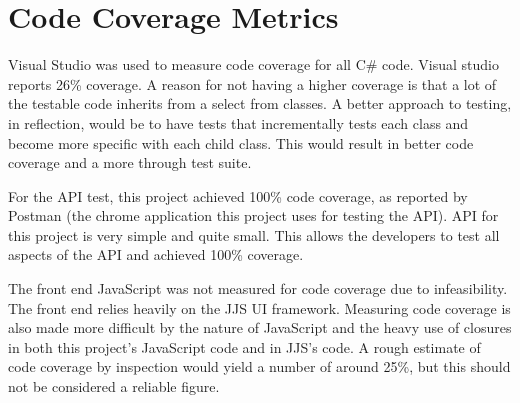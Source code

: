 \documentclass[12pt, titlepage]{article}
\begin{document}
\section{Code Coverage Metrics}
Visual Studio was used to measure code coverage for all C\# code. Visual studio
reports 26\% coverage. A reason for not having a higher coverage is that a lot of
the testable code inherits from a select from classes. A better approach to
testing, in reflection, would be to have tests that incrementally tests each
class and become more specific with each child class. This would result in
better code coverage and a more through test suite.

For the API test, this project achieved 100\% code coverage, as reported by
Postman (the chrome application this project uses for testing the API). API for
this project is very simple and quite small. This allows the developers to test
all aspects of the API and achieved 100\% coverage.

The front end JavaScript was not measured for code coverage due to infeasibility.
The front end relies heavily on the JJS UI framework. Measuring code coverage
is also made more difficult by the nature of JavaScript and the heavy use of
closures in both this project's JavaScript code and in JJS's code. A rough
estimate of code coverage by inspection would yield a number of around 25\%, but
this should not be considered a reliable figure.




\end{document}
